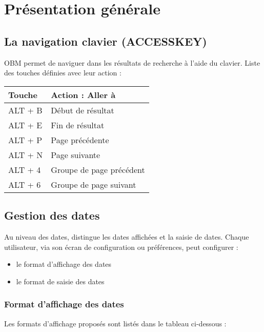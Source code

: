 
\clearpage
\section{Présentation générale}

\subsection{La navigation clavier (ACCESSKEY)}

OBM permet de naviguer dans les résultats de recherche à l'aide du clavier.
Liste des touches définies avec leur action :\\

\begin{tabular}{|p{4cm}|p{8cm}|}
\hline
\textbf{Touche} & \textbf{Action : Aller à} \\
\hline
ALT + B & Début de résultat\\
\hline
ALT + E & Fin de résultat\\
\hline
ALT + P & Page précédente\\
\hline
ALT + N & Page suivante\\
\hline
ALT + 4 & Groupe de page précédent\\
\hline
ALT + 6 & Groupe de page suivant\\
\hline
\end{tabular}


\subsection{Gestion des dates}

Au niveau des dates, \obm distingue les dates affichées et la saisie de dates.
Chaque utilisateur, via son écran de configuration ou préférences, peut configurer :\\
\begin{itemize}
\item le format d'affichage des dates
\item le format de saisie des dates
\end{itemize}

\subsubsection{Format d'affichage des dates}

Les formats d'affichage proposés sont listés dans le tableau ci-dessous :\\

